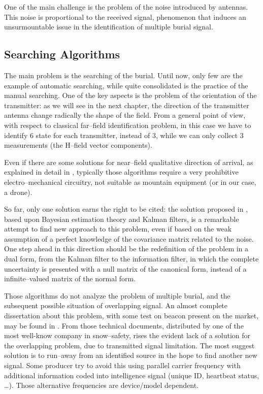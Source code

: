 One of the main challenge is the problem of the noise introduced by antennas. This noise is proportional to the received signal, phenomenon that induces an unsurmountable issue in the identification of multiple burial signal.

\subsection{Searching Algorithms}

The main problem is the searching of the burial. Until now, only few are the example of automatic searching, while quite consolidated is the practice of the manual searching. One of the key aspects is the problem of the orientation of the transmitter: as we will see in the next chapter, the direction of the transmitter antenna change radically the shape of the field. From a general point of view, with respect to classical far--field identification problem, in this case we have to identify 6 state for each transmitter, instead of 3, while we can only collect 3 measurements (the H--field vector components).

Even if there are some solutions for near--field qualitative direction of arrival, as explained in detail in \citep{hutchinson2000arrl}, typically those algorithms require a very prohibitive electro--mechanical circuitry, not suitable as mountain equipment (or in our case, a drone).

So far, only one solution earns the right to be cited: the solution proposed in \citep{pinies2006fast,pinies2006localization}, based upon Bayesian estimation theory and Kalman filters, is a remarkable attempt to find new approach to this problem, even if based on the weak assumption of a perfect knowledge of the covariance matrix related to the noise. One step ahead in this direction should be the redefinition of the problem in a dual form, from the Kalman filter to the information filter, in which the complete uncertainty is presented with a null matrix of the canonical form, instead of a infinite--valued matrix of the normal form. 

Those algorithms do not analyze the problem of multiple burial, and the subsequent possible situation of overlapping signal. An almost complete dissertation about this problem, with some test on beacon present on the market, may be found in \citep{signaloverlappingARVA1,signaloverlappingARVA2}. From those technical documents, distributed by one of the most well-know company in snow--safety, rises the evident lack of a solution for the overlapping problem, due to transmitted signal limitation. The most suggest solution is to run--away from an identified source in the hope to find another new signal. Some producer try to avoid this using parallel carrier frequency with additional information coded into intelligence signal (unique ID, heartbeat status, \dots). Those alternative frequencies are device/model dependent.

